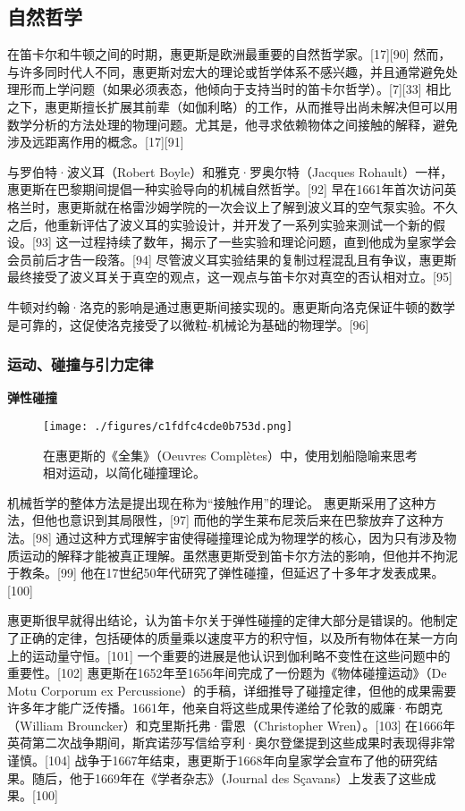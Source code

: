 \subsection{自然哲学}
在笛卡尔和牛顿之间的时期，惠更斯是欧洲最重要的自然哲学家。[17][90] 然而，与许多同时代人不同，惠更斯对宏大的理论或哲学体系不感兴趣，并且通常避免处理形而上学问题（如果必须表态，他倾向于支持当时的笛卡尔哲学）。[7][33] 相比之下，惠更斯擅长扩展其前辈（如伽利略）的工作，从而推导出尚未解决但可以用数学分析的方法处理的物理问题。尤其是，他寻求依赖物体之间接触的解释，避免涉及远距离作用的概念。[17][91]

与罗伯特·波义耳（Robert Boyle）和雅克·罗奥尔特（Jacques Rohault）一样，惠更斯在巴黎期间提倡一种实验导向的机械自然哲学。[92] 早在1661年首次访问英格兰时，惠更斯就在格雷沙姆学院的一次会议上了解到波义耳的空气泵实验。不久之后，他重新评估了波义耳的实验设计，并开发了一系列实验来测试一个新的假设。[93] 这一过程持续了数年，揭示了一些实验和理论问题，直到他成为皇家学会会员前后才告一段落。[94] 尽管波义耳实验结果的复制过程混乱且有争议，惠更斯最终接受了波义耳关于真空的观点，这一观点与笛卡尔对真空的否认相对立。[95]

牛顿对约翰·洛克的影响是通过惠更斯间接实现的。惠更斯向洛克保证牛顿的数学是可靠的，这促使洛克接受了以微粒-机械论为基础的物理学。[96]
\subsubsection{运动、碰撞与引力定律}
\textbf{弹性碰撞}
\begin{figure}[ht]
\centering
\texttt{[image: ./figures/c1fdfc4cde0b753d.png]}
\caption{在惠更斯的《全集》（Oeuvres Complètes）中，使用划船隐喻来思考相对运动，以简化碰撞理论。} \label{fig_HGS_9}
\end{figure}
机械哲学的整体方法是提出现在称为“接触作用”的理论。 惠更斯采用了这种方法，但他也意识到其局限性，[97] 而他的学生莱布尼茨后来在巴黎放弃了这种方法。[98] 通过这种方式理解宇宙使得碰撞理论成为物理学的核心，因为只有涉及物质运动的解释才能被真正理解。虽然惠更斯受到笛卡尔方法的影响，但他并不拘泥于教条。[99] 他在17世纪50年代研究了弹性碰撞，但延迟了十多年才发表成果。[100]

惠更斯很早就得出结论，认为笛卡尔关于弹性碰撞的定律大部分是错误的。他制定了正确的定律，包括硬体的质量乘以速度平方的积守恒，以及所有物体在某一方向上的运动量守恒。[101] 一个重要的进展是他认识到伽利略不变性在这些问题中的重要性。[102] 惠更斯在1652年至1656年间完成了一份题为《物体碰撞运动》（De Motu Corporum ex Percussione）的手稿，详细推导了碰撞定律，但他的成果需要许多年才能广泛传播。1661年，他亲自将这些成果传递给了伦敦的威廉·布朗克（William Brouncker）和克里斯托弗·雷恩（Christopher Wren）。[103] 在1666年英荷第二次战争期间，斯宾诺莎写信给亨利·奥尔登堡提到这些成果时表现得非常谨慎。[104] 战争于1667年结束，惠更斯于1668年向皇家学会宣布了他的研究结果。随后，他于1669年在《学者杂志》（Journal des Sçavans）上发表了这些成果。[100]

